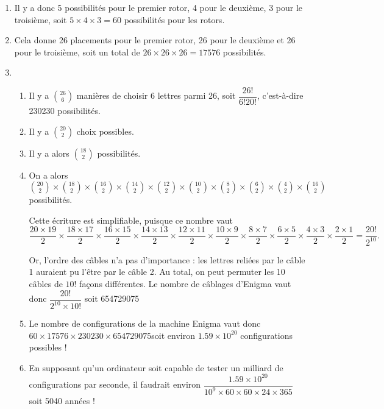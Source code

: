 \documentclass[11pt,fleqn, openany]{book} %
\begin{document}
\begin{solution}\hspace{0pt}
\begin{enumerate}
\item  Il y a donc 5 possibilités pour le premier rotor, 4 pour le deuxième, 3 pour le troisième, soit $5\times 4 \times 3 = 60$ possibilités pour les rotors.

\item Cela donne 26 placements pour le premier rotor, 26 pour le deuxième et 26 pour le troisième, soit un total de $26 \times 26 \times 26 = 17576$ possibilités.
\item 
\begin{enumerate}
\item Il y a $\binom{26}{6}$ manières de choisir 6 lettres parmi 26, soit $\dfrac{26!}{6!	20!}$, c'est-à-dire 230230 possibilités.
\item Il y a $\binom{20}{2}$ choix possibles.
\item Il y a alors $\binom{18}{2}$ possibilités.

\item 
On a alors $\binom{20}{2} \times \binom{18}{2} \times \binom{16}{2}\times \binom{14}{2}\times \binom{12}{2}\times \binom{10}{2}\times \binom{8}{2}\times \binom{6}{2}\times \binom{4}{2}\times \binom{16}{2}$ possibilités.

Cette écriture est simplifiable, puisque ce nombre vaut
\[\dfrac{20 \times 19}{2} \times \dfrac{18 \times 17}{2} \times \dfrac{16 \times 15}{2} \times \dfrac{14 \times 13}{2} \times \dfrac{12 \times 11}{2} \times \dfrac{10 \times 9}{2} \times \dfrac{8 \times 7}{2} \times \dfrac{6 \times 5}{2} \times \dfrac{4 \times 3}{2} \times \dfrac{2 \times 1}{2} = \dfrac{20!}{2^{10}}.\] 

Or, l'ordre des câbles n'a pas d'importance : les lettres reliées par le câble 1 auraient pu l'être par le câble 2. Au total, on peut permuter les 10 câbles de $10!$ façons différentes. Le nombre de câblages d'Enigma vaut donc $\dfrac{20!}{2^{10} \times 10!}$ soit 654729075
\item Le nombre de configurations de la machine Enigma vaut donc $60 \times 17576 \times 230230 \times 654729075$soit environ $1.59 \times 10^{20}$ configurations possibles !

\item En supposant qu'un ordinateur soit capable de tester un milliard de configurations par seconde, il faudrait environ $\dfrac{1.59 \times 10^{20}}{10^9 \times 60 \times 60 \times 24 \times 365}$ soit 5040 années !

\end{enumerate}
\end{enumerate}
\end{solution}
\end{document}
